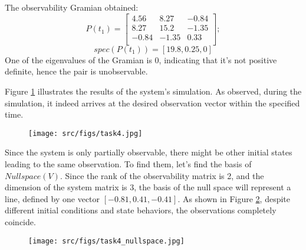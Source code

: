 The observability Gramian obtained:
\[
        P(t_1) = \begin{bmatrix}
        4.56 & 8.27 & -0.84 \\
        8.27 & 15.2 & -1.35 \\
        -0.84 & -1.35 & 0.33 \\
        \end{bmatrix};
\]
\[
        spec(P(t_1)) = [19.8,  0.25, 0]
\]
One of the eigenvalues of the Gramian is 0, indicating that it's not positive definite, hence the pair is unobservable.

Figure \ref{fig:task4} illustrates the results of the system's simulation. As observed, during the simulation, it indeed arrives at the desired observation vector within the specified time.
\begin{figure}[ht!]
        \centering
        \texttt{[image: src/figs/task4.jpg]}
        \label{fig:task4}
\end{figure}

Since the system is only partially observable, there might be other initial states leading to the same observation. To find them, let's find the basis of \(Nullspace(V)\). Since the rank of the observability matrix is 2, and the dimension of the system matrix is 3, the basis of the null space will represent a line, defined by one vector \([-0.81, 0.41, -0.41]\).
As shown in Figure \ref{fig:task4_null}, despite different initial conditions and state behaviors, the observations completely coincide.
\begin{figure}[ht!]
        \centering
        \texttt{[image: src/figs/task4\_nullspace.jpg]}
        \label{fig:task4_null}
\end{figure}
